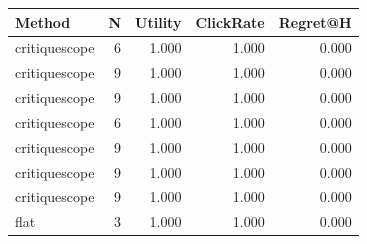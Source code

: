 \begin{tabular}{lrrrr}
\toprule
Method & N & Utility & ClickRate & Regret@H \\
\midrule
critiquescope & 6 & 1.000 & 1.000 & 0.000 \\
critiquescope & 9 & 1.000 & 1.000 & 0.000 \\
critiquescope & 9 & 1.000 & 1.000 & 0.000 \\
critiquescope & 6 & 1.000 & 1.000 & 0.000 \\
critiquescope & 9 & 1.000 & 1.000 & 0.000 \\
critiquescope & 9 & 1.000 & 1.000 & 0.000 \\
critiquescope & 9 & 1.000 & 1.000 & 0.000 \\
flat & 3 & 1.000 & 1.000 & 0.000 \\
\bottomrule
\end{tabular}
